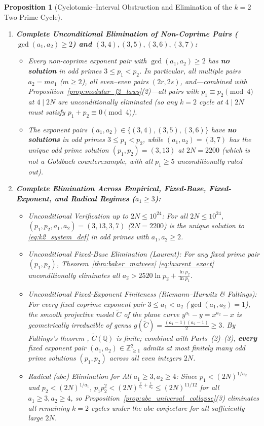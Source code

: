 \documentclass[11pt,a4paper]{article}
\newtheorem{proposition}[theorem]{Proposition}
\theoremstyle{definition}
\begin{document}
\begin{proposition}[Cyclotomic--Interval Obstruction and Elimination of the $k=2$ Two-Prime Cycle]
\begin{enumerate}
    \item \textbf{Complete Unconditional Elimination of Non-Coprime Pairs ($\gcd(a_1, a_2) \ge 2$) and $(3, 4), (3, 5), (3, 6), (3, 7)$:}
    \begin{itemize}
        \item Every non-coprime exponent pair with $\gcd(a_1, a_2) \ge 2$ has \textbf{no solution} in odd primes $3 \le p_1 < p_2$. In particular, all multiple pairs $a_2 = m a_1$ ($m \ge 2$), all even--even pairs $(2r, 2s)$, and---combined with Proposition~\ref{prop:modular_f2_laws}(2)---all pairs with $p_1 \equiv p_2 \pmod 4$ at $4 \mid 2N$ are unconditionally eliminated (so any $k = 2$ cycle at $4 \mid 2N$ must satisfy $p_1 + p_2 \equiv 0 \pmod 4$).
        \item The exponent pairs $(a_1, a_2) \in \{(3, 4), (3, 5), (3, 6)\}$ have \textbf{no solutions} in odd primes $3 \le p_1 < p_2$, while $(a_1, a_2) = (3, 7)$ has the unique odd prime solution $(p_1, p_2) = (3, 13)$ at $2N = 2200$ (which is not a Goldbach counterexample, with all $p_1 \ge 5$ unconditionally ruled out).
    \end{itemize}
    \item \textbf{Complete Elimination Across Empirical, Fixed-Base, Fixed-Exponent, and Radical Regimes ($a_1 \ge 3$):}
    \begin{itemize}
        \item \emph{Unconditional Verification up to $2N \le 10^{24}$:} For all $2N \le 10^{24}$, $(p_1, p_2, a_1, a_2) = (3, 13, 3, 7)$ ($2N = 2200$) is the unique solution to \eqref{eq:k2_system_def} in odd primes with $a_1, a_2 \ge 2$.
        \item \emph{Unconditional Fixed-Base Elimination (Laurent):} For any fixed prime pair $(p_1, p_2)$, Theorem~\ref{thm:baker_matveev} \eqref{eq:laurent_exact} unconditionally eliminates all $a_2 > 2520 \ln p_2 + \frac{\ln p_2}{\ln p_1}$.
        \item \emph{Unconditional Fixed-Exponent Finiteness (Riemann--Hurwitz \& Faltings):} For every fixed coprime exponent pair $3 \le a_1 < a_2$ ($\gcd(a_1, a_2) = 1$), the smooth projective model $\widetilde{C}$ of the plane curve $y^{a_1} - y = x^{a_2} - x$ is geometrically irreducible of genus $g(\widetilde{C}) = \frac{(a_1 - 1)(a_2 - 1)}{2} \ge 3$. By Faltings's theorem \cite{faltings1983}, $\widetilde{C}(\mathbb{Q})$ is finite; combined with Parts~(2)--(3), \textbf{every} fixed exponent pair $(a_1, a_2) \in \mathbb{Z}_{\ge 1}^2$ admits at most finitely many odd prime solutions $(p_1, p_2)$ across all even integers $2N$.
        \item \emph{Radical ($abc$) Elimination for All $a_1 \ge 3, a_2 \ge 4$:} Since $p_1 < (2N)^{1/a_2}$ and $p_2 < (2N)^{1/a_1}$, $p_1 p_2^2 < (2N)^{\frac{2}{a_1} + \frac{1}{a_2}} \le (2N)^{11/12}$ for all $a_1 \ge 3, a_2 \ge 4$, so Proposition~\ref{prop:abc_universal_collapse}(3) eliminates all remaining $k = 2$ cycles under the $abc$ conjecture for all sufficiently large $2N$.
    \end{itemize}
\end{enumerate}
\end{proposition}
\end{document}
